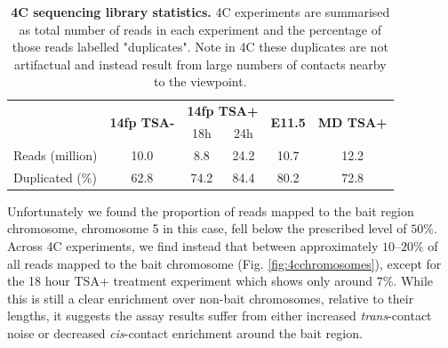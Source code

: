 \documentclass[a4paper,11pt,oneside]{book}
\begin{document}
\begin{table}[]
\centering
\caption[4C sequencing library statistics.]{ {\bf 4C sequencing library statistics.}
4C experiments are summarised as total number of reads in each experiment and the percentage of those reads labelled "duplicates". Note in 4C these duplicates are not artifactual and instead result from large numbers of contacts nearby to the viewpoint.
}
\label{tab:4c}
\begin{tabular}{l|c|cc|c|c|}
\cline{2-6}
                                      & \multirow{2}{*}{{\bf 14fp TSA-}} & \multicolumn{2}{c|}{{\bf 14fp TSA+}} & \multirow{2}{*}{{\bf E11.5}} & \multirow{2}{*}{{\bf MD TSA+}} \\
                                      &                                  & 18h               & 24h              &                              &                                \\ \hline
\multicolumn{1}{|l|}{Reads (million)} & 10.0                             & 8.8               & 24.2             & 10.7                         & 12.2                           \\
\multicolumn{1}{|l|}{Duplicated (\%)} & 62.8                             & 74.2              & 84.4             & 80.2                         & 72.8                           \\ \hline
\end{tabular}
\end{table}


Unfortunately we found the proportion of reads mapped to the bait region chromosome, chromosome 5 in this case, fell below the prescribed level of $50\%$. Across 4C experiments, we find instead that between approximately $10$--$20\%$ of all reads mapped to the bait chromosome (Fig. \ref{fig:4cchromosomes}), except for  the 18 hour TSA+ treatment experiment which shows only around $7\%$. While this is still a clear enrichment over non-bait chromosomes, relative to their lengths, it suggests the assay results suffer from either increased \emph{trans}-contact noise or decreased \emph{cis}-contact enrichment around the bait region. 
\end{document}
